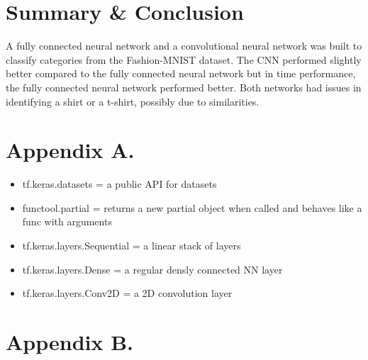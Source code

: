 \documentclass[a4paper,12pt]{article}
\begin{document}
\newpage
\section{Summary \& Conclusion}

A fully connected neural network and a convolutional neural network was built to classify categories from the Fashion-MNIST dataset. The CNN performed slightly better compared to the fully connected neural network but in time performance, the fully connected neural network performed better. Both networks had issues in identifying a shirt or a t-shirt, possibly due to similarities.

\section{Appendix A. }
\begin{itemize}
\item tf.keras.datasets = a public API for datasets
\item functool.partial = returns a new partial object when called and behaves like a func with arguments
\item tf.keras.layers.Sequential = a linear stack of layers
\item tf.keras.layers.Dense = a regular densly connected NN layer
\item tf.keras.layers.Conv2D = a 2D convolution layer
\end{itemize}
\newpage
\section{Appendix B.}

\end{document}
